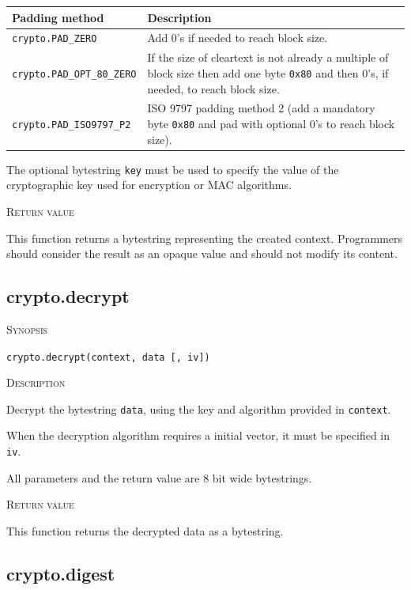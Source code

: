 \documentclass[11pt]{report}
\newcommand{\mansection}[1]{\vspace{0.5em}\par\noindent\textsc{#1}\vspace{0.5em}\par}
\newcommand{\syn}[1]{\texttt{#1}}
\begin{document}
  \vspace{2em}
  \begin{tabular}{|l|p{8cm}|}
  \hline
  \textbf{Padding method}           & \textbf{Description} \\
  \hline
  \hline
  \syn{crypto.PAD\_ZERO}            & Add 0's if needed to reach block size. \\
  \hline
  \syn{crypto.PAD\_OPT\_80\_ZERO}   & If the size of cleartext is not already a multiple of block size then
                                      add one byte \texttt{0x80} and then 0's, if needed, to reach block 
                                      size. \\
  \hline
  \syn{crypto.PAD\_ISO9797\_P2}     & ISO 9797 padding method 2 (add a mandatory byte \texttt{0x80} and 
                                      pad with optional 0's to reach block size). \\
  \hline
  \end{tabular}
  \vspace{2em}

  The optional bytestring \syn{key} must be used to specify the value of the cryptographic key used for 
  encryption or MAC algorithms. 

\mansection{Return value}
  This function returns a bytestring representing the created context. Programmers should consider the 
  result as an opaque value and should not modify its content. 

\subsection{crypto.decrypt}

\mansection{Synopsis}
\syn{crypto.decrypt(context, data [, iv])}

\mansection{Description}
Decrypt the bytestring \syn{data}, using the key and algorithm provided in \syn{context}. 

When the decryption algorithm requires a initial vector, it must be specified in \syn{iv}.

All parameters and the return value are 8 bit wide bytestrings.

\mansection{Return value}
This function returns the decrypted data as a bytestring.  

\subsection{crypto.digest}
\end{document}
